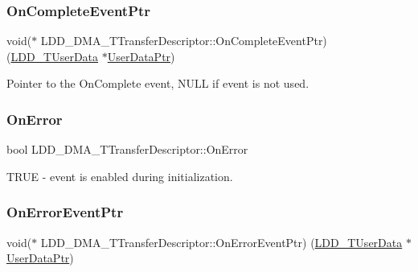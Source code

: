\subsubsection{\texorpdfstring{On\+Complete\+Event\+Ptr}{OnCompleteEventPtr}}
{\footnotesize\ttfamily void($\ast$ L\+D\+D\+\_\+\+D\+M\+A\+\_\+\+T\+Transfer\+Descriptor\+::\+On\+Complete\+Event\+Ptr) (\hyperlink{group___p_e___types__module_ga0b66a73f87238a782318aa0be7578e35}{L\+D\+D\+\_\+\+T\+User\+Data} $\ast$\hyperlink{struct_l_d_d___d_m_a___t_transfer_descriptor_a4136d6742944c7b04a94695c78b581b8}{User\+Data\+Ptr})}

Pointer to the On\+Complete event, N\+U\+LL if event is not used. \mbox{\label{struct_l_d_d___d_m_a___t_transfer_descriptor_a3ddeb9c7243015b0ee7afd15235ce37b}} 
\subsubsection{\texorpdfstring{On\+Error}{OnError}}
{\footnotesize\ttfamily bool L\+D\+D\+\_\+\+D\+M\+A\+\_\+\+T\+Transfer\+Descriptor\+::\+On\+Error}

T\+R\+UE -\/ event is enabled during initialization. \mbox{\label{struct_l_d_d___d_m_a___t_transfer_descriptor_a9d97c36a86505594fd2642c1242f7460}} 
\subsubsection{\texorpdfstring{On\+Error\+Event\+Ptr}{OnErrorEventPtr}}
{\footnotesize\ttfamily void($\ast$ L\+D\+D\+\_\+\+D\+M\+A\+\_\+\+T\+Transfer\+Descriptor\+::\+On\+Error\+Event\+Ptr) (\hyperlink{group___p_e___types__module_ga0b66a73f87238a782318aa0be7578e35}{L\+D\+D\+\_\+\+T\+User\+Data} $\ast$\hyperlink{struct_l_d_d___d_m_a___t_transfer_descriptor_a4136d6742944c7b04a94695c78b581b8}{User\+Data\+Ptr})}

